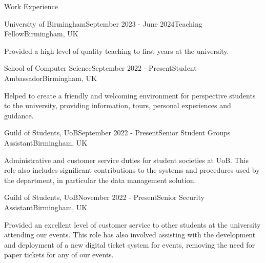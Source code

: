 \documentclass{resume} %
\begin{document}



\begin{rSection}{Work Experience}


\begin{rSubsection}{University of Birmingham}{September 2023 - June 2024}{Teaching Fellow}{Birmingham, UK}
\item Provided a high level of quality teaching to first years at the university.
\end{rSubsection}


\begin{rSubsection}{School of Computer Science}{September 2022 - Present}{Student Ambassador}{Birmingham, UK}
\item  Helped to create a friendly and welcoming environment for perspective students to the university, providing information, tours, personal experiences and guidance. 
\end{rSubsection}


\begin{rSubsection}{Guild of Students, UoB}{September 2022 - Present}{Senior Student Groups Assistant}{Birmingham, UK}
\item Administrative and customer service duties for student societies at UoB. This role also includes significant contributions to the systems and procedures used by the department, in particular the data management solution. 
\end{rSubsection}


\begin{rSubsection}{Guild of Students, UoB}{November 2022 - Present}{Senior Security Assistant}{Birmingham, UK}
\item Provided an excellent level of customer service to other students at the university attending our events. This role has also involved assisting with the development and deployment of a new digital ticket system for events, removing the need for paper tickets for any of our events. 
\end{rSubsection}



\end{rSection}
\end{document}
